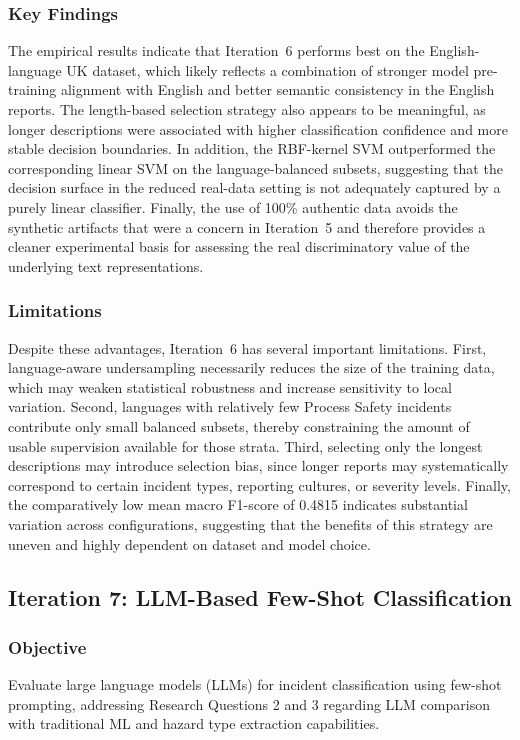 \documentclass[11pt, titlepage, bibliography=totoc]{scrreprt}
\begin{document}
\subsubsection{Key Findings}
The empirical results indicate that Iteration~6 performs best on the English-language UK dataset, which likely reflects a combination of stronger model pre-training alignment with English and better semantic consistency in the English reports. The length-based selection strategy also appears to be meaningful, as longer descriptions were associated with higher classification confidence and more stable decision boundaries. In addition, the RBF-kernel SVM outperformed the corresponding linear SVM on the language-balanced subsets, suggesting that the decision surface in the reduced real-data setting is not adequately captured by a purely linear classifier. Finally, the use of 100\% authentic data avoids the synthetic artifacts that were a concern in Iteration~5 and therefore provides a cleaner experimental basis for assessing the real discriminatory value of the underlying text representations.

\subsubsection{Limitations}
Despite these advantages, Iteration~6 has several important limitations. First, language-aware undersampling necessarily reduces the size of the training data, which may weaken statistical robustness and increase sensitivity to local variation. Second, languages with relatively few Process Safety incidents contribute only small balanced subsets, thereby constraining the amount of usable supervision available for those strata. Third, selecting only the longest descriptions may introduce selection bias, since longer reports may systematically correspond to certain incident types, reporting cultures, or severity levels. Finally, the comparatively low mean macro F1-score of 0.4815 indicates substantial variation across configurations, suggesting that the benefits of this strategy are uneven and highly dependent on dataset and model choice.

\subsection{Iteration 7: LLM-Based Few-Shot Classification}

\subsubsection{Objective}
Evaluate large language models (LLMs) for incident classification using few-shot prompting, addressing Research Questions 2 and 3 regarding LLM comparison with traditional ML and hazard type extraction capabilities.
\end{document}
